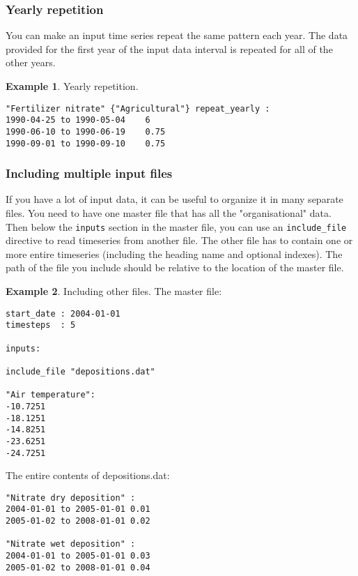 \documentclass[11pt]{article}
\theoremstyle{definition}
\newtheorem{myexample}{Example}
\newenvironment{example}%
  {\begin{lrbox}{\examplebox}%
   \begin{minipage}{\dimexpr\linewidth-2\fboxsep}
   \begin{myexample}}%
  {\end{myexample}%
   \end{minipage}%
   \end{lrbox}%
   \begin{trivlist}
     \item[]\colorbox{silver}{\usebox\examplebox}
   \end{trivlist}}
\begin{document}
\subsubsection{Yearly repetition}

You can make an input time series repeat the same pattern each year. The data provided for the first year of the input data interval is repeated for all of the other years.

\begin{example}
Yearly repetition.
\begin{lstlisting}
"Fertilizer nitrate" {"Agricultural"} repeat_yearly :
1990-04-25 to 1990-05-04	6
1990-06-10 to 1990-06-19	0.75
1990-09-01 to 1990-09-10	0.75
\end{lstlisting}
\end{example}

\subsubsection{Including multiple input files}

If you have a lot of input data, it can be useful to organize it in many separate files. You need to have one master file that has all the "organisational" data. Then below the {\tt inputs} section in the master file, you can use an {\tt include\_file} directive to read timeseries from another file. The other file has to contain one or more entire timeseries (including the heading name and optional indexes). The path of the file you include should be relative to the location of the master file.

\begin{example}
Including other files. The master file:
\begin{lstlisting}
start_date : 2004-01-01
timesteps  : 5

inputs:

include_file "depositions.dat"

"Air temperature":
-10.7251
-18.1251
-14.8251
-23.6251
-24.7251
\end{lstlisting}
The entire contents of depositions.dat:
\begin{lstlisting}
"Nitrate dry deposition" :
2004-01-01 to 2005-01-01 0.01
2005-01-02 to 2008-01-01 0.02

"Nitrate wet deposition" :
2004-01-01 to 2005-01-01 0.03
2005-01-02 to 2008-01-01 0.04
\end{lstlisting}
\end{example}
\end{document}
